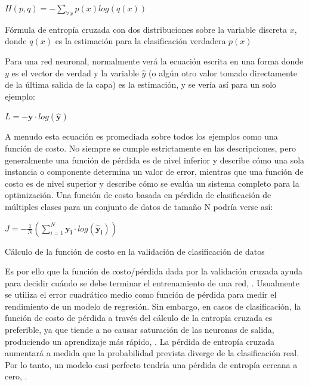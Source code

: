 			\begingroup\makeatletter{}\check@mathfonts
			\begin{center}
			$H(p,q) = -\sum_{\forall x} p(x) log(q(x))$
			\end{center}
			\begin{center}
			{\small{Fórmula de entropía cruzada con dos distribuciones sobre la variable discreta $x$, donde $q(x)$ es la estimación para la clasificación verdadera $p(x)$}}
			\end{center}
			\endgroup		

		Para una red neuronal, normalmente verá la ecuación escrita en una forma donde $y$ es el vector de verdad y la variable $\hat{y}$ (o algún otro valor tomado directamente de la última salida de la capa) es la estimación, y se vería así para un solo ejemplo:
			
			\begingroup\makeatletter{}\check@mathfonts
			\begin{center}
			$L = - \mathbf{y} \cdot log(\mathbf{\hat{y}})$
			\end{center}
			\endgroup		
		
		A menudo esta ecuación es promediada sobre todos los ejemplos como una función de costo. No siempre se cumple estrictamente en las descripciones, pero generalmente una función de pérdida es de nivel inferior y describe cómo una sola instancia o componente determina un valor de error, mientras que una función de costo es de nivel superior y describe cómo se evalúa un sistema completo para la optimización. Una función de costo basada en pérdida de clasificación de múltiples clases para un conjunto de datos de tamaño N podría verse así:
		
			\begingroup\makeatletter{}\check@mathfonts
			\begin{center}
			$J = - \frac{1}{N}(\sum_{i=1}^{N} \mathbf{y_i} \cdot log(\mathbf{\hat{y}_i}))$
			\end{center}
			\begin{center}
			{\small{Cálculo de la función de costo en la validación de clasificación de datos}}
			\end{center}
			\endgroup		
	

		Es por ello que la función de costo/pérdida dada por la validación cruzada ayuda para decidir cuándo se debe terminar el entrenamiento de una red, \citep{AulaMLP}. Usualmente se utiliza el error cuadrático medio como función de pérdida para medir el rendimiento de un modelo de regresión. Sin embargo, en casos de clasificación, la función de costo de pérdida a través del cálculo de la entropía cruzada es preferible, ya que tiende a no causar saturación de las neuronas de salida, produciendo un aprendizaje más rápido, \citep{AulaDNN}. La pérdida de entropía cruzada aumentará a medida que la probabilidad prevista diverge de la clasificación real. Por lo tanto, un modelo casi perfecto tendría una pérdida de entropía cercana a cero, \citep{crossMSE}.
		


